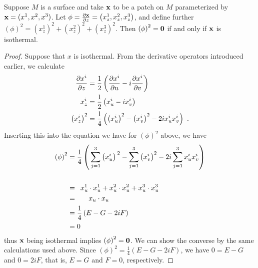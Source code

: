   \begin{lem}
    Suppose $M$ is a surface and take $\mathbf{x}$ to be a patch on $M$ parameterized by $\mathbf{x} = (x^1, x^2, x^3)$. Let $\phi = \frac{\partial \mathbf{x}}{\partial z} = \left(x_z^1, x_z^2, x_z^3\right)$, and define further $\left(\phi\right)^2 = \left(x_z^1\right)^2 + \left(x_z^2\right)^2 + \left(x_z^3\right)^2$. Then $\left(\phi\right)^2 = \mathbf{0}$ if and only if $\mathbf{x}$ is isothermal.
  \end{lem}
  \begin{proof}
    Suppose that $x$ is isothermal. From the derivative operators introduced earlier, we calculate
    \begin{align*}
      \frac{\partial x^i}{\partial z} &= \frac{1}{2}\left(\frac{\partial x^i}{\partial u} - i\frac{\partial x^i}{\partial v}\right)\\
      x^i_z &= \frac{1}{2}\left(x^i_u - ix^i_v\right)\\
      \left(x^i_z\right)^2 &= \frac{1}{4}\left(\left(x_u^i\right)^2 - \left(x_v^i\right)^2 - 2ix_u^ix_v^i\right) \ .
    \end{align*}
    Inserting this into the equation we have for $\left(\phi\right)^2$ above, we have
    \begin{align*}
      \left(\phi\right)^2 &= \frac{1}{4}\left(\tikzmark{tleft}{}\sum_{j = 1}^3 {\left(x_u^i\right)\tikzmark{tright}{}}^2 - \sum_{j = 1}^3 \left(x_v^i\right)^2 - 2i\sum_{j = 1}^3 x_u^i x_v^i\right)\\
      &\\
      &=\,\,\,\tikzmark{nleft}{}x_u^1\cdot x_u^1 + x_u^2\cdot x_u^2 + x_u^3\cdot x_u^3\tikzmark{nright}{}\\
      &=\,\,\,\,\,\,\,\,\,\,\tikzmark{nnleft}{}x_u \cdot x_u\tikzmark{nnright}{}\\
      &= \frac{1}{4}\left(\tikzmark{bleft}{}E\tikzmark{bright}{} - G - 2iF\right)\\
      &= 0
    \end{align*}
    thus $\mathbf{x}$ being isothermal implies $\left(\phi\right)^2 = \mathbf{0}$. We can show the converse by the same calculations used above. Since $\left(\phi\right)^2 = \frac{1}{4}(E - G - 2iF)$, we have $0 = E - G$ and $0 = 2iF$, that is, $E = G$ and $F = 0$, respectively.
  \end{proof}

